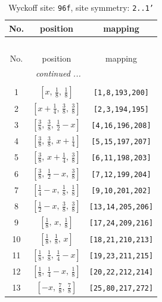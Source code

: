 \documentclass[fleqn,8pt]{jsarticle}
\begin{document}
\begin{longtable}{ccc}
\caption{Wyckoff site: {\tt 96f}, site symmetry: {\tt 2..1'}}
 \\
 \hline \hline
No. & position & mapping \\ \hline \endfirsthead

\multicolumn{2}{l}{\tablename\ \thetable{}} \\
 \hline \hline
No. & position & mapping \\ \hline \endhead

 \hline \hline
\multicolumn{2}{r}{\footnotesize\it continued ...} \\ \endfoot

 \hline \hline
\multicolumn{2}{r}{} \\ \endlastfoot

1 & $\left[ x,\, \frac{1}{8},\, \frac{1}{8} \right]$ & {\tt [1,8,193,200]} \\ \hline
2 & $\left[ x + \frac{1}{4},\, \frac{3}{8},\, \frac{3}{8} \right]$ & {\tt [2,3,194,195]} \\ \hline
3 & $\left[ \frac{3}{8},\, \frac{3}{8},\, \frac{1}{2} - x \right]$ & {\tt [4,16,196,208]} \\ \hline
4 & $\left[ \frac{3}{8},\, \frac{3}{8},\, x + \frac{1}{4} \right]$ & {\tt [5,15,197,207]} \\ \hline
5 & $\left[ \frac{3}{8},\, x + \frac{1}{4},\, \frac{3}{8} \right]$ & {\tt [6,11,198,203]} \\ \hline
6 & $\left[ \frac{3}{8},\, \frac{1}{2} - x,\, \frac{3}{8} \right]$ & {\tt [7,12,199,204]} \\ \hline
7 & $\left[ \frac{1}{4} - x,\, \frac{1}{8},\, \frac{1}{8} \right]$ & {\tt [9,10,201,202]} \\ \hline
8 & $\left[ \frac{1}{2} - x,\, \frac{3}{8},\, \frac{3}{8} \right]$ & {\tt [13,14,205,206]} \\ \hline
9 & $\left[ \frac{1}{8},\, x,\, \frac{1}{8} \right]$ & {\tt [17,24,209,216]} \\ \hline
10 & $\left[ \frac{1}{8},\, \frac{1}{8},\, x \right]$ & {\tt [18,21,210,213]} \\ \hline
11 & $\left[ \frac{1}{8},\, \frac{1}{8},\, \frac{1}{4} - x \right]$ & {\tt [19,23,211,215]} \\ \hline
12 & $\left[ \frac{1}{8},\, \frac{1}{4} - x,\, \frac{1}{8} \right]$ & {\tt [20,22,212,214]} \\ \hline
13 & $\left[ - x,\, \frac{7}{8},\, \frac{7}{8} \right]$ & {\tt [25,80,217,272]} \\ \hline

\end{longtable}
\end{document}
